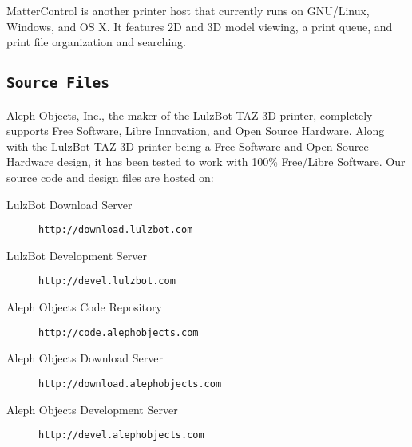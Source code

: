 MatterControl is another printer host that currently runs on GNU/Linux, Windows, and OS X. It features 2D and 3D model viewing, a print queue, and print file organization and searching.

\subsection{\texttt{Source Files}}
Aleph Objects, Inc., the maker of the LulzBot\textsuperscript{\miniscule{\textregistered}} TAZ 3D printer, completely supports Free Software, Libre Innovation, and Open Source Hardware. Along with the LulzBot TAZ 3D printer being a Free Software and Open Source Hardware design, it has been tested to work with 100\% Free/Libre Software. Our source code and design files are hosted on:

\begin{description}
\item [LulzBot Download Server] \texttt{http://download.lulzbot.com}
\item [LulzBot Development Server] \texttt{http://devel.lulzbot.com}
\item [Aleph Objects Code Repository] \texttt{http://code.alephobjects.com}
\item [Aleph Objects Download Server] \texttt{http://download.alephobjects.com}
\item [Aleph Objects Development Server] \texttt{http://devel.alephobjects.com}
\end{description}



